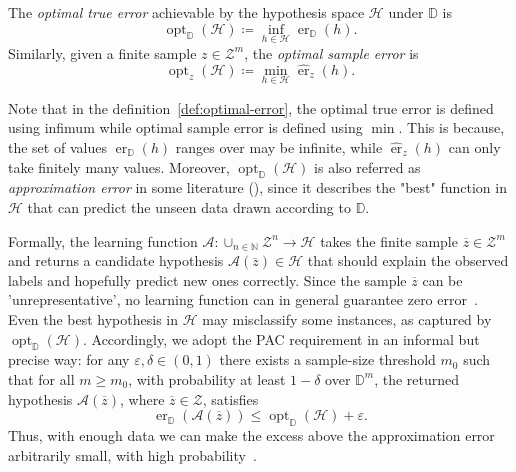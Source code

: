 \begin{definition}
    \label{def:optimal-error}
    The \emph{optimal true error} achievable by the hypothesis space $\mathcal{H}$ under $\mathbb{D}$ is
    \[
        \operatorname{opt}_{\mathbb{D}}(\mathcal{H}) \coloneqq \inf_{h\in\mathcal{H}} \operatorname{er}_{\mathbb{D}}(h).
    \]
    Similarly, given a finite sample $z \in \mathcal{Z}^m$, the \emph{optimal sample error} is
    \[
        \operatorname{opt}_{z}(\mathcal{H}) \coloneqq \min_{h\in\mathcal{H}} \hat{\operatorname{er}}_{z}(h).
    \]
\end{definition}

Note that in the definition~\ref{def:optimal-error}, the optimal true error is defined using infimum while optimal sample error is defined using $\min$. This is because, the set of values $\operatorname{er}_{\mathbb{D}}(h)$ ranges over may be infinite, while $\hat{\operatorname{er}}_{z}(h)$ can only take finitely many values. Moreover, $\operatorname{opt}_{\mathbb{D}}(\mathcal{H})$ is also referred as \textit{approximation error} in some literature (\cite[\S 2.1]{AnthonyBartlett1999}), since it describes the "best" function in $\mathcal{H}$ that can predict the unseen data drawn according to $\mathbb{D}$.


\medskip

Formally, the learning function $\mathcal{A}: \cup_{n \in \mathbb{N}} \mathcal{Z}^n \to \mathcal{H}$ takes the finite sample $\overline{z} \in \mathcal{Z}^m$ and returns a candidate hypothesis $\mathcal{A}(\overline{z}) \in \mathcal{H}$ that should explain the observed labels and hopefully predict new ones correctly. Since the sample $\overline{z}$ can be 'unrepresentative', no learning function can in general guarantee zero error~\cite[\S 2.1, p.16]{AnthonyBartlett1999}. Even the best hypothesis in $\mathcal{H}$ may misclassify some instances, as captured by $\operatorname{opt}_{\mathbb{D}}(\mathcal{H})$. Accordingly, we adopt the PAC requirement in an informal but precise way: for any $\varepsilon,\delta\in(0,1)$ there exists a sample-size threshold $m_0$ such that for all $m\ge m_0$, with probability at least $1-\delta$ over $\mathbb{D}^m$, the returned hypothesis $\mathcal{A}(\overline{z})$, where $\overline{z} \in \mathcal{Z}$, satisfies
\[
    \operatorname{er}_{\mathbb{D}}(\mathcal{A}(\overline{z})) \le \operatorname{opt}_{\mathbb{D}}(\mathcal{H}) + \varepsilon.
\]
Thus, with enough data we can make the excess above the approximation error arbitrarily small, with high probability~\cite[Sec.~3.1, p.~43]{UnderstandinMachineLearning}.

